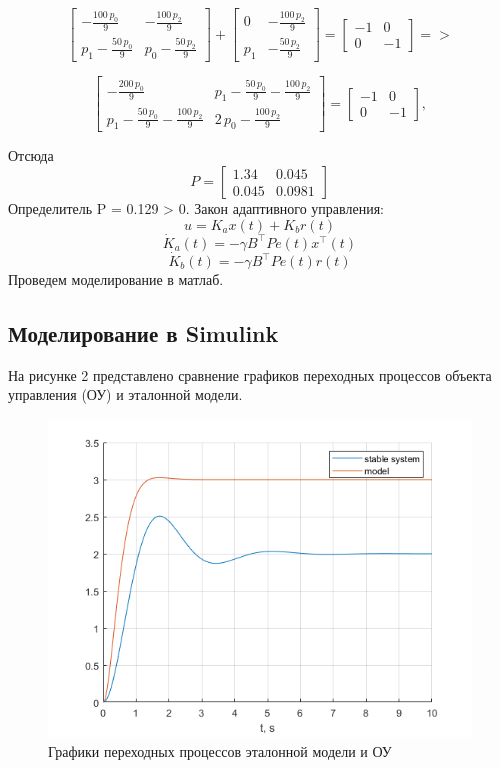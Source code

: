 \documentclass[a4paper,12pt]{extarticle} %
\begin{document}
\[
\begin{bmatrix}
-\frac{100\,p_0 }{9} & -\frac{100\,p_2 }{9}\\
p_1 -\frac{50\,p_0 }{9} & p_0 -\frac{50\,p_2 }{9}
\end{bmatrix} + 
\begin{bmatrix}
0 & -\frac{100\,p_2 }{9}\\
p_1  & -\frac{50\,p_2 }{9}
\end{bmatrix} = 
\begin{bmatrix} -1 & 0 \\ 0 & -1 \end{bmatrix} =>
\]

\[
\begin{bmatrix}
-\frac{200\,p_0 }{9} & p_1 -\frac{50\,p_0 }{9}-\frac{100\,p_2 }{9}\\
p_1 -\frac{50\,p_0 }{9}-\frac{100\,p_2 }{9} & 2\,p_0 -\frac{100\,p_2 }{9}
\end{bmatrix} = 
\begin{bmatrix} -1 & 0 \\ 0 & -1 \end{bmatrix},
\]

Отсюда
\[
P = \begin{bmatrix} 1.34 & 0.045 \\ 0.045 & 0.0981 \end{bmatrix}
\]
Определитель P = 0.129 > 0.
Закон адаптивного управления:
\[
u = K_ax(t) + K_br(t)
\]
\[
\dot{K}_a(t) = -\gamma B^\top Pe(t) x^\top(t)
\]
\[
\dot{K}_b(t) = -\gamma B^\top Pe(t) r(t)
\]
Проведем моделирование в матлаб.
\subsection*{Моделирование в Simulink}

На рисунке 2 представлено сравнение графиков переходных процессов объекта управления (ОУ) и эталонной модели.
\begin{figure}[h]
    \centering
    \includegraphics[width=0.9\linewidth]{2.png}
    \caption{Графики переходных процессов эталонной модели и ОУ}
    \label{fig:2}
\end{figure}
\end{document}
